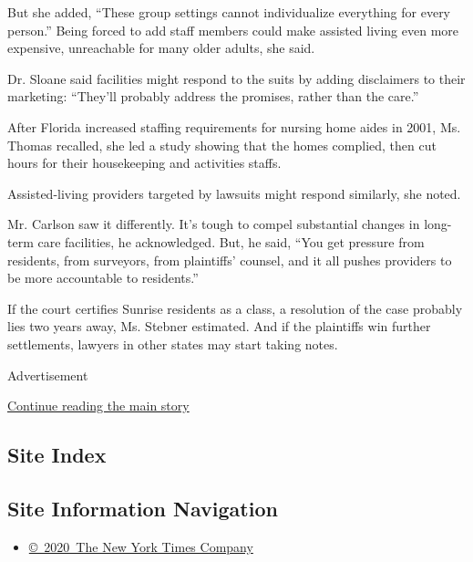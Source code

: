 But she added, ``These group settings cannot individualize everything
for every person.'' Being forced to add staff members could make
assisted living even more expensive, unreachable for many older adults,
she said.

Dr. Sloane said facilities might respond to the suits by adding
disclaimers to their marketing: ``They'll probably address the promises,
rather than the care.''

After Florida increased staffing requirements for nursing home aides in
2001, Ms. Thomas recalled, she led a study showing that the homes
complied, then cut hours for their housekeeping and activities staffs.

Assisted-living providers targeted by lawsuits might respond similarly,
she noted.

Mr. Carlson saw it differently. It's tough to compel substantial changes
in long-term care facilities, he acknowledged. But, he said, ``You get
pressure from residents, from surveyors, from plaintiffs' counsel, and
it all pushes providers to be more accountable to residents.''

If the court certifies Sunrise residents as a class, a resolution of the
case probably lies two years away, Ms. Stebner estimated. And if the
plaintiffs win further settlements, lawyers in other states may start
taking notes.

Advertisement

\protect\hyperlink{after-bottom}{Continue reading the main story}

\hypertarget{site-index}{%
\subsection{Site Index}\label{site-index}}

\hypertarget{site-information-navigation}{%
\subsection{Site Information
Navigation}\label{site-information-navigation}}

\begin{itemize}
\tightlist
\item
  \href{https://help.nytimes3xbfgragh.onion/hc/en-us/articles/115014792127-Copyright-notice}{©~2020~The
  New York Times Company}
\end{itemize}

